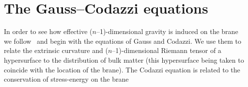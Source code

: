 \documentclass[a4paper,10pt]{article}
\begin{document}
\section{The Gauss--Codazzi equations}
\setcounter{equation}{0}

In order to see how effective ($n$--1)-dimensional gravity is induced
on the brane we follow~\cite{Shiromizu} and begin with the equations
of Gauss and Codazzi. We use them to relate the extrinsic curvature
and ($n$--1)-dimensional Riemann tensor of a hypersurface to the
distribution of bulk matter (this hypersurface being taken to coincide
with the location of the brane). The Codazzi equation is related to
the conservation of stress-energy on the brane
\end{document}

